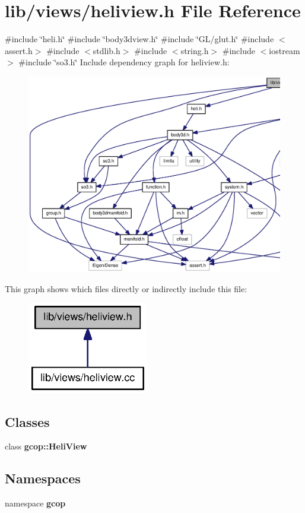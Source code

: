 \section{lib/views/heliview.h \-File \-Reference}
\label{heliview_8h}
{\ttfamily \#include \char`\"{}heli.\-h\char`\"{}}\*
{\ttfamily \#include \char`\"{}body3dview.\-h\char`\"{}}\*
{\ttfamily \#include \char`\"{}\-G\-L/glut.\-h\char`\"{}}\*
{\ttfamily \#include $<$assert.\-h$>$}\*
{\ttfamily \#include $<$stdlib.\-h$>$}\*
{\ttfamily \#include $<$string.\-h$>$}\*
{\ttfamily \#include $<$iostream$>$}\*
{\ttfamily \#include \char`\"{}so3.\-h\char`\"{}}\*
\-Include dependency graph for heliview.\-h\-:\nopagebreak
\begin{figure}[H]
\begin{center}
\leavevmode
\includegraphics[width=350pt]{heliview_8h__incl}
\end{center}
\end{figure}
\-This graph shows which files directly or indirectly include this file\-:\nopagebreak
\begin{figure}[H]
\begin{center}
\leavevmode
\includegraphics[width=150pt]{heliview_8h__dep__incl}
\end{center}
\end{figure}
\subsection*{\-Classes}
\begin{DoxyCompactItemize}
\item 
class {\bf gcop\-::\-Heli\-View}
\end{DoxyCompactItemize}
\subsection*{\-Namespaces}
\begin{DoxyCompactItemize}
\item 
namespace {\bf gcop}
\end{DoxyCompactItemize}
